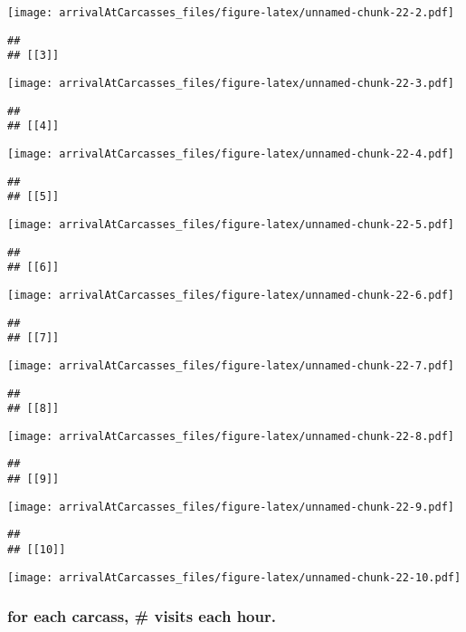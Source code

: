 \documentclass[
]{article}
\begin{document}
\texttt{[image: arrivalAtCarcasses\_files/figure-latex/unnamed-chunk-22-2.pdf]}

\begin{verbatim}
## 
## [[3]]
\end{verbatim}

\texttt{[image: arrivalAtCarcasses\_files/figure-latex/unnamed-chunk-22-3.pdf]}

\begin{verbatim}
## 
## [[4]]
\end{verbatim}

\texttt{[image: arrivalAtCarcasses\_files/figure-latex/unnamed-chunk-22-4.pdf]}

\begin{verbatim}
## 
## [[5]]
\end{verbatim}

\texttt{[image: arrivalAtCarcasses\_files/figure-latex/unnamed-chunk-22-5.pdf]}

\begin{verbatim}
## 
## [[6]]
\end{verbatim}

\texttt{[image: arrivalAtCarcasses\_files/figure-latex/unnamed-chunk-22-6.pdf]}

\begin{verbatim}
## 
## [[7]]
\end{verbatim}

\texttt{[image: arrivalAtCarcasses\_files/figure-latex/unnamed-chunk-22-7.pdf]}

\begin{verbatim}
## 
## [[8]]
\end{verbatim}

\texttt{[image: arrivalAtCarcasses\_files/figure-latex/unnamed-chunk-22-8.pdf]}

\begin{verbatim}
## 
## [[9]]
\end{verbatim}

\texttt{[image: arrivalAtCarcasses\_files/figure-latex/unnamed-chunk-22-9.pdf]}

\begin{verbatim}
## 
## [[10]]
\end{verbatim}

\texttt{[image: arrivalAtCarcasses\_files/figure-latex/unnamed-chunk-22-10.pdf]}

\hypertarget{for-each-carcass-visits-each-hour.}{%
\subsubsection{for each carcass, \# visits each
hour.}\label{for-each-carcass-visits-each-hour.}}
\end{document}
